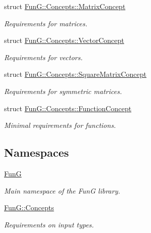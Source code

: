 \begin{DoxyCompactItemize}
struct \hyperlink{structFunG_1_1Concepts_1_1MatrixConcept}{Fun\-G\-::\-Concepts\-::\-Matrix\-Concept}
\begin{DoxyCompactList}\small\item\em Requirements for matrices. \end{DoxyCompactList}\item 
struct \hyperlink{structFunG_1_1Concepts_1_1VectorConcept}{Fun\-G\-::\-Concepts\-::\-Vector\-Concept}
\begin{DoxyCompactList}\small\item\em Requirements for vectors. \end{DoxyCompactList}\item 
struct \hyperlink{structFunG_1_1Concepts_1_1SquareMatrixConcept}{Fun\-G\-::\-Concepts\-::\-Square\-Matrix\-Concept}
\begin{DoxyCompactList}\small\item\em Requirements for symmetric matrices. \end{DoxyCompactList}\item 
struct \hyperlink{structFunG_1_1Concepts_1_1FunctionConcept}{Fun\-G\-::\-Concepts\-::\-Function\-Concept}
\begin{DoxyCompactList}\small\item\em Minimal requirements for functions. \end{DoxyCompactList}\end{DoxyCompactItemize}
\subsection*{Namespaces}
\begin{DoxyCompactItemize}
\item 
\hyperlink{namespaceFunG}{Fun\-G}
\begin{DoxyCompactList}\small\item\em Main namespace of the Fun\-G library. \end{DoxyCompactList}\item 
\hyperlink{namespaceFunG_1_1Concepts}{Fun\-G\-::\-Concepts}
\begin{DoxyCompactList}\small\item\em Requirements on input types. \end{DoxyCompactList}\end{DoxyCompactItemize}
